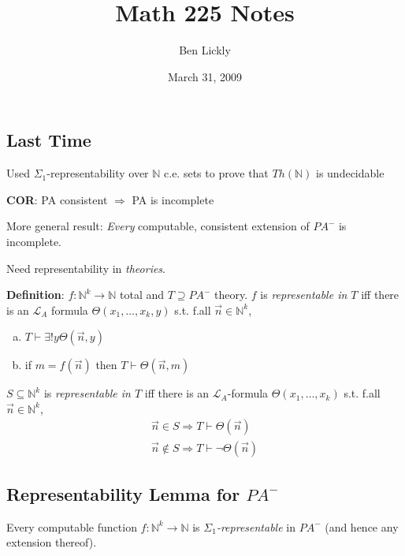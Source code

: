 \documentclass[12pt]{article}
\author{Ben Lickly}
\date{March 31, 2009}
\title{Math 225 Notes}
\newcommand{\Nat}{\ensuremath{\mathbb{N}}}
\newcommand{\proves}{\vdash}
\newcommand{\defn}{\textbf{Definition}: }
\begin{document}
\maketitle

\subsection*{Last Time}
Used $\Sigma_1$-representability over $\Nat$
c.e. sets to prove that $Th(\Nat)$ is undecidable

\textbf{COR}: PA consistent $\Rightarrow$ PA is incomplete

More general result:
\emph{Every} computable, consistent extension of $PA^-$ is incomplete.

Need representability in \emph{theories}.

\defn $f : \Nat^k \rightarrow \Nat$ total
        and $T \supseteq PA^-$ theory.
$f$ is \emph{representable in $T$} iff there is an $\mathcal{L}_A$ formula
$\Theta(x_1, \dots, x_k, y)$ s.t. f.all $\vec{n}\in\Nat^k$,
\begin{enumerate}[(a)]
  \item $T \proves \exists !y \Theta(\vec{n},y)$
  \item if $m = f(\vec{n})$ then $T \proves \Theta(\vec{n}, m)$
\end{enumerate}

$S \subseteq \Nat^k$ is \emph{representable in $T$} iff 
there is an $\mathcal{L}_A$-formula
$\Theta(x_1, \dots, x_k)$ s.t. f.all $\vec{n} \in \Nat^k$,
\begin{align*}
  \vec{n} \in S \Rightarrow T \proves \Theta(\vec{n}) \\
  \vec{n} \not\in S \Rightarrow T \proves \neg\Theta(\vec{n})
\end{align*}

\subsection*{Representability Lemma for $PA^-$}
Every computable function $f: \Nat^k \rightarrow \Nat$
is \emph{$\Sigma_1$-representable} in $PA^-$ (and hence any extension thereof).
\end{document}
